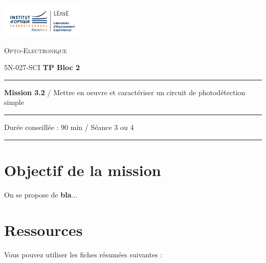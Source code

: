 \newpage
\pagestyle{empty}

\begin{minipage}[c]{.25\linewidth}
	\includegraphics[width=4cm]{images/Logo-LEnsE.png}
\end{minipage} \hfill
\begin{minipage}[c]{.4\linewidth}

\begin{center}
\vspace{0.3cm}
{\Large \textsc{Opto-Electronique}}

\medskip

5N-027-SCI \qquad \textbf{\Large TP Bloc 2}

\end{center}
\end{minipage}\hfill

\vspace{0.5cm}

\noindent \rule{\linewidth}{1pt}

{\noindent\Large \textbf{Mission 3.2} / Mettre en oeuvre et caractériser un circuit de photodétection simple} 

\vspace{-0.5cm}

\begin{center}
\noindent \rule{\linewidth}{1pt}

Durée conseillée : 90 min / Séance 3 ou 4

\vspace{-0.2cm}
\noindent \rule{\linewidth}{1pt}
\end{center}

\section{Objectif de la mission}
\label{mission32}

On se propose de \textbf{bla}...

\section{Ressources}

Vous pouvez utiliser les fiches résumées suivantes : 

